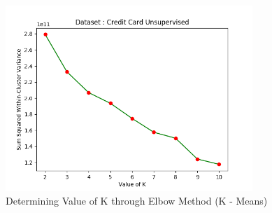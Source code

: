 \documentclass[12pt]{article}
\begin{document}
\begin{figure}[H]
	\centering
	\includegraphics[width = 0.7\linewidth, height = 7cm]{Elbow_CreditCard.png}
	\caption{Determining Value of K through Elbow Method (K - Means)}
	\label{fig:elbow_credit}
\end{figure}
\end{document}

